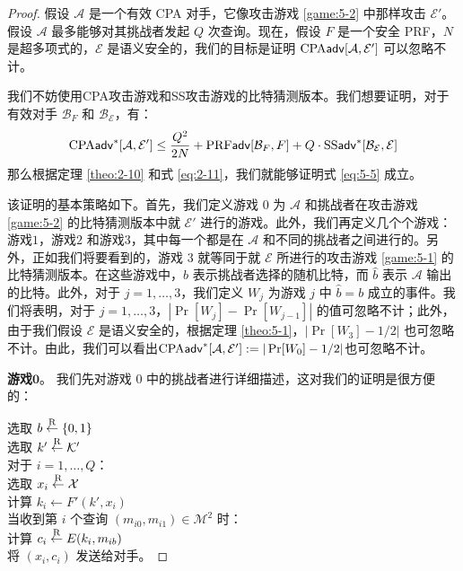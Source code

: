 \begin{proof}
假设 $\mathcal{A}$ 是一个有效 CPA 对手，它像攻击游戏 \ref{game:5-2} 中那样攻击 $\mathcal{E}'$。假设 $\mathcal{A}$ 最多能够对其挑战者发起 $Q$ 次查询。现在，假设 $F$ 是一个安全 PRF，$N$ 是超多项式的，$\mathcal{E}$ 是语义安全的，我们的目标是证明 ${\rm CPA}\mathsf{adv}[\mathcal{A},\mathcal{E}']$ 可以忽略不计。

我们不妨使用CPA攻击游戏和SS攻击游戏的比特猜测版本。我们想要证明，对于有效对手 $\mathcal{B}_F$ 和 $\mathcal{B}_\mathcal{E}$，有：
\begin{equation}\label{eq:5-6}
{\rm CPA}\mathsf{adv}^*[\mathcal{A},\mathcal{E}']\leq
\frac{Q^2}{2N}+{\rm PRF}\mathsf{adv}[\mathcal{B}_F,F]+Q\cdot{\rm SS}\mathsf{adv}^*[\mathcal{B}_\mathcal{E},\mathcal{E}]
\end{equation}
那么根据定理 \ref{theo:2-10} 和式 \ref{eq:2-11}，我们就能够证明式 \ref{eq:5-5} 成立。

该证明的基本策略如下。首先，我们定义游戏 $0$ 为 $\mathcal{A}$ 和挑战者在攻击游戏 \ref{game:5-2} 的比特猜测版本中就 $\mathcal{E}'$ 进行的游戏。此外，我们再定义几个个游戏：游戏$1$，游戏$2$ 和游戏$3$，其中每一个都是在 $\mathcal{A}$ 和不同的挑战者之间进行的。另外，正如我们将要看到的，游戏 $3$ 就等同于就 $\mathcal{E}$ 所进行的攻击游戏 \ref{game:5-1} 的比特猜测版本。在这些游戏中，$b$ 表示挑战者选择的随机比特，而 $\hat b$ 表示 $\mathcal{A}$ 输出的比特。此外，对于 $j = 1,\dots,3$，我们定义 $W_j$ 为游戏 $j$ 中 $\hat{b}=b$ 成立的事件。我们将表明，对于 $j = 1,\dots,3$，$|\Pr[W_j]-\Pr[W_{j-1}]|$ 的值可忽略不计；此外，由于我们假设 $\mathcal{E}$ 是语义安全的，根据定理 \ref	{theo:5-1}，$|\Pr[W_3]-{1}/{2}|$ 也可忽略不计。由此，我们可以看出${\rm CPA}\mathsf{adv}^*[\mathcal{A},\mathcal{E}']:=|\Pr[W_0]-{1}/{2}|$也可忽略不计。

\vspace{5pt}

\noindent\textbf{游戏$\mathbf{0}$}。
我们先对游戏 $0$ 中的挑战者进行详细描述，这对我们的证明是很方便的：

\vspace{5pt}

\hspace*{5pt} 选取 $b\overset{\rm R}\leftarrow\{0,1\}$\\
\hspace*{26pt} 选取 $k'\overset{\rm R}\leftarrow\mathcal{K}'$\\
\hspace*{26pt} 对于 $i=1,\dots,Q$：\\
\hspace*{50pt} 选取 $x_i\overset{\rm R}\leftarrow\mathcal{X}$\\
\hspace*{50pt} 计算 $k_i\leftarrow F'(k',x_i)$\\
\hspace*{26pt} 当收到第 $i$ 个查询 $(m_{i0},m_{i1})\in\mathcal{M}^2$ 时：\\
\hspace*{50pt} 计算 $c_i\overset{\rm R}\leftarrow E(k_i,m_{ib})$\\
\hspace*{50pt} 将 $(x_i,c_i)$ 发送给对手。


\end{proof}
